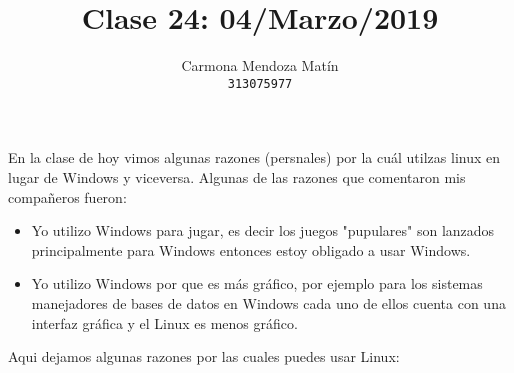\documentclass[11pt, a4paper]{report}
\begin{document}
\title{Clase 24: 04/Marzo/2019}
\author{
  Carmona Mendoza Mat\'in\\
  \texttt{313075977}
}
\date{}
\maketitle
En la clase de hoy vimos algunas razones (persnales) por la cuál utilzas
linux en lugar de Windows y viceversa. Algunas de las razones que
comentaron mis compañeros fueron:

\begin{itemize}
\item Yo utilizo Windows para jugar, es decir los juegos "pupulares" son
  lanzados principalmente para Windows entonces estoy obligado a usar
  Windows.
\item Yo utilizo Windows por que es más gráfico, por ejemplo para los
  sistemas manejadores de bases de datos en Windows cada uno de ellos
  cuenta con una interfaz gráfica y el Linux es menos gráfico.
\end{itemize}

Aqui dejamos algunas razones por las cuales puedes usar Linux:
\end{document}
